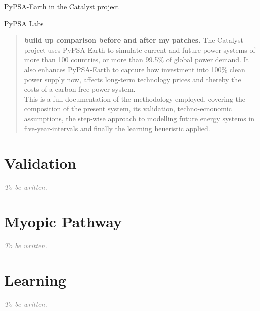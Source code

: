\documentclass[11pt,a4paper]{article}
\newcommand{\tbd}{\textcolor{gray}{\emph{To be written.}}}
\begin{document}
\begin{center}
{\LARGE PyPSA-Earth in the Catalyst project\par}\vspace{4pt}
{PyPSA Labs\par}
\end{center}

\begin{quote}\small
  \textbf{build up comparison before and after my patches.}
  The Catalyst project uses PyPSA-Earth to simulate current and future power systems of more than 100 countries, or more than 99.5\% of global power demand.
  It also enhances PyPSA-Earth to capture how investment into 100\% clean power supply now, affects long-term technology prices and thereby the costs of a carbon-free power system.\\
  This is a full documentation of the methodology employed, covering the composition of the present system, its validation, techno-ecnonomic assumptions, the step-wise approach to modelling future energy systems in five-year-intervals and finally the learning heueristic applied.
\end{quote}

{\small\tableofcontents}
\clearpage

\setlength{\parindent}{0pt}
\setlength{\parskip}{0.5\baselineskip plus 1pt}












\section{Validation}\label{sec:validation}
\tbd

\section{Myopic Pathway}\label{sec:myopic}
\tbd

\section{Learning}\label{sec:learning}
\tbd

\printbibliography
\end{document}

